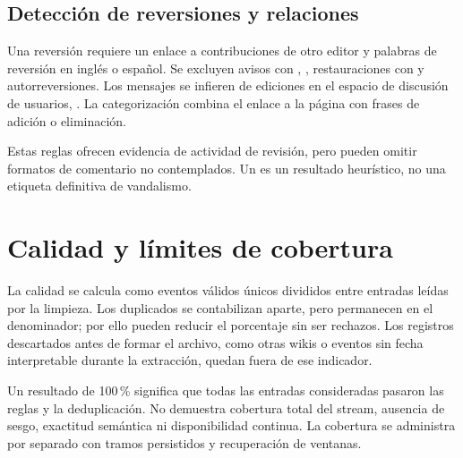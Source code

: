 \subsection{Detección de reversiones y relaciones}
Una reversión requiere un enlace a contribuciones de otro editor y palabras de reversión en inglés o español. Se excluyen avisos con , , restauraciones con  y autorreversiones. Los mensajes se infieren de ediciones en el espacio de discusión de usuarios, . La categorización combina el enlace a la página con frases de adición o eliminación.

Estas reglas ofrecen evidencia de actividad de revisión, pero pueden omitir formatos de comentario no contemplados. Un  es un resultado heurístico, no una etiqueta definitiva de vandalismo.

\section{Calidad y límites de cobertura}
La calidad se calcula como eventos válidos únicos divididos entre entradas leídas por la limpieza. Los duplicados se contabilizan aparte, pero permanecen en el denominador; por ello pueden reducir el porcentaje sin ser rechazos. Los registros descartados antes de formar el archivo, como otras wikis o eventos sin fecha interpretable durante la extracción, quedan fuera de ese indicador.

Un resultado de 100\,\% significa que todas las entradas consideradas pasaron las reglas y la deduplicación. No demuestra cobertura total del stream, ausencia de sesgo, exactitud semántica ni disponibilidad continua. La cobertura se administra por separado con tramos persistidos y recuperación de ventanas.
